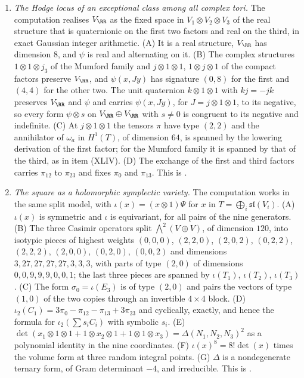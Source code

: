 \begin{enumerate}[label=\textup{(\Roman*)},leftmargin=*]
\item \emph{The Hodge locus of an exceptional class among all complex tori.}
  The computation realises $V_{\RR}$ as the fixed space in $V_{1}\otimes V_{2}\otimes V_{3}$ of the real structure that
  is quaternionic on the first two factors and real on the third, in exact
  Gaussian integer arithmetic. (A) It is a real structure, $V_{\RR}$ has
  dimension $8$, and $\psi$ is real and alternating on it. (B) The complex
  structures $1\otimes1\otimes j_{3}$ of the Mumford family and
  $j\otimes1\otimes1$, $1\otimes j\otimes1$ of the compact factors preserve
  $V_{\RR}$, and $\psi(x,Jy)$ has signature $(0,8)$ for the first and $(4,4)$
  for the other two. The unit quaternion $k\otimes1\otimes1$ with $kj=-jk$
  preserves $V_{\RR}$ and $\psi$ and carries $\psi(x,Jy)$, for
  $J=j\otimes1\otimes1$, to its negative, so every form $\psi\otimes s$ on
  $V_{\RR}\oplus V_{\RR}$ with $s\ne0$ is congruent to its negative and
  indefinite. (C) At $j\otimes1\otimes1$ the tensors $\pi$ have type $(2,2)$ and the annihilator of $\omega_{a}$ in
  $H^{1}(T)$, of dimension $64$, is spanned by the lowering derivation of the
  first factor; for the Mumford family it is spanned by that of the third,
  as in item (XLIV). (D) The exchange of the first and third factors carries
  $\pi_{12}$ to $\pi_{23}$ and fixes $\pi_{0}$ and $\pi_{13}$. This is
  .

\item \emph{The square as a holomorphic symplectic variety.} The
  computation works in the same split model, with
  $\iota(x)=(x\otimes1)\Psi$ for $x$ in $T=\bigoplus_{i}\mathfrak{sl}(V_{i})$.
  (A) $\iota(x)$ is symmetric and $\iota$ is equivariant, for all pairs of the
  nine generators. (B) The three Casimir operators split
  $\bigwedge^{2}(V\oplus V)$, of dimension $120$, into isotypic pieces of
  highest weights $(0,0,0)$, $(2,2,0)$, $(2,0,2)$, $(0,2,2)$, $(2,2,2)$,
  $(2,0,0)$, $(0,2,0)$, $(0,0,2)$ and dimensions $3,27,27,27,27,3,3,3$, with
  parts of type $(2,0)$ of dimensions $0,0,9,9,9,0,0,1$; the last three pieces
  are spanned by $\iota(T_{1})$, $\iota(T_{2})$, $\iota(T_{3})$. (C) The form
  $\sigma_{0}=\iota(E_{3})$ is of type $(2,0)$ and pairs the vectors of type
  $(1,0)$ of the two copies through an invertible $4\times4$ block. (D)
  $\iota_{2}(C_{1})=3\pi_{0}-\pi_{12}-\pi_{13}+3\pi_{23}$ and cyclically,
  exactly, and hence the formula for $\iota_{2}(\sum s_{i}C_{i})$ with symbolic
  $s_{i}$. (E) $\det(x_{1}\otimes1\otimes1+1\otimes x_{2}\otimes1+
  1\otimes1\otimes x_{3})=\Delta(N_{1},N_{2},N_{3})^{2}$ as a polynomial
  identity in the nine coordinates. (F) $\iota(x)^{8}=8!\det(x)$ times the
  volume form at three random integral points. (G) $\Delta$ is a
  nondegenerate ternary form, of Gram determinant $-4$, and irreducible. This
  is .


\end{enumerate}

